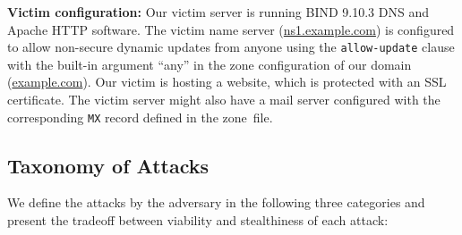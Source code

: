
\textbf{Victim configuration:} Our victim server is running BIND 9.10.3 DNS and Apache HTTP software. 
The victim name server (\url{ns1.example.com}) is configured to allow non-secure dynamic updates %
from anyone using the \texttt{allow-update} clause with the built-in argument ``any'' in the zone configuration of our domain (\url{example.com}). %
%
Our victim is hosting a website, 
which is protected with an SSL certificate. 
The victim server might also have a mail server configured with the corresponding \texttt{MX} record defined in the zone~file.  


\subsection{Taxonomy of Attacks}
We define the attacks by the adversary in the following three categories and present the tradeoff between viability and stealthiness of each attack:


